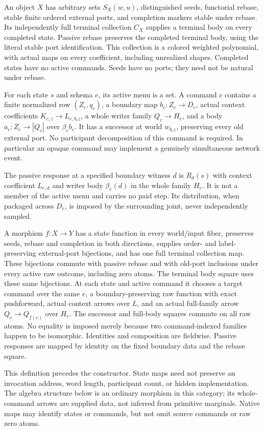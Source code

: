 \documentclass[11pt]{article}
\begin{document}
An object $X$ has arbitrary sets $S_X(w,u)$, distinguished seeds, functorial rebase, stable finite ordered external ports, and completion markers stable under rebase. Its independently full terminal collection $C_X$ supplies a terminal body on every completed state. Passive rebase preserves the completed terminal body, using the literal stable port identification. This collection is a colored weighted polynomial, with actual maps on every coefficient, including unrealized shapes. Completed states have no active commands. Seeds have no ports; they need not be natural under rebase.

For each state $s$ and schema $e$, its active menu is a set. A command $c$ contains a finite normalized row $(Z_c,q_c)$, a boundary map $b_c:Z_c\to D_e$, actual context coefficients $K_{c,z}\to L_{e,b_cz}$, a whole writer family $Q_c\to H_e$, and a body $a_c:Z_c\to |Q_c|$ over $\beta_e b_c$. It has a successor at world $w_{b_cz}$, preserving every old external port. No participant decomposition of this command is required. In particular an opaque command may implement a genuinely simultaneous network event.

The passive response at a specified boundary witness $d$ is $R_d(s)$ with context coefficient $L_{e,d}$ and writer body $\beta_e(d)$ in the whole family $H_e$. It is not a member of the active menu and carries no paid step. Its distribution, when packaged across $D_e$, is imposed by the surrounding joint, never independently sampled.

A morphism $f:X\to Y$ has a state function in every world/input fiber, preserves seeds, rebase and completion in both directions, supplies order- and label-preserving external-port bijections, and has one full terminal collection map. These bijections commute with passive rebase and with old-port inclusions under every active raw outcome, including zero atoms. The terminal body square uses these same bijections. At each state and active command it chooses a target command over the same $e$, a boundary-preserving raw function with exact pushforward, actual context arrows over $L$, and an actual full-family arrow $Q_c\to Q_{f(c)}$ over $H_e$. The successor and full-body squares commute on all raw atoms. No equality is imposed merely because two command-indexed families happen to be isomorphic. Identities and composition are fieldwise. Passive responses are mapped by identity on the fixed boundary data and the rebase square.

This definition precedes the constructor. State maps need not preserve an invocation address, word length, participant count, or hidden implementation. The algebra structure below is an ordinary morphism in this category; its whole-command arrows are supplied data, not inferred from primitive marginals. Native maps may identify states or commands, but not omit source commands or raw zero atoms.
\end{document}
